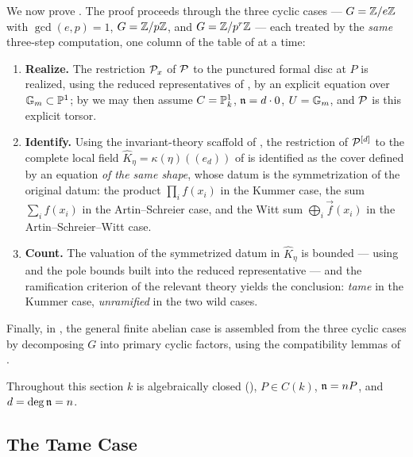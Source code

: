 We now prove . The proof proceeds
through the three cyclic cases --- $G = \mathbb{Z}/e\mathbb{Z}$ with $\gcd(e,p) = 1$,
$G = \mathbb{Z}/p\mathbb{Z}$, and $G = \mathbb{Z}/p^r\mathbb{Z}$ --- each treated by the \emph{same}
three-step computation, one column of the table of
 at a time:
\begin{enumerate}
    \item \textbf{Realize.} The restriction $\mathcal{P}_x$ of $\mathcal{P}$ to the punctured
    formal disc at $P$ is realized, using the reduced representatives of
    , by an explicit equation over
    $\mathbb{G}_m \subset \mathbb{P}^1$; by  we may then assume
    $C = \mathbb{P}^1_k$, $\mathfrak{n} = d \cdot 0$, $U = \mathbb{G}_m$, and $\mathcal{P}$ is this
    explicit torsor.
    \item \textbf{Identify.} Using the invariant-theory scaffold of
    , the restriction of $\mathcal{P}^{[d]}$ to the
    complete local field $\widehat K_\eta = \kappa(\eta)((e_d))$ of
     is identified as the cover
    defined by an equation \emph{of the same shape}, whose datum is the
    symmetrization of the original datum: the product $\prod_i f(x_i)$ in the
    Kummer case, the sum $\sum_i f(x_i)$ in the Artin--Schreier case, and the
    Witt sum $\bigoplus_i \vec f(x_i)$ in the Artin--Schreier--Witt case.
    \item \textbf{Count.} The valuation of the symmetrized datum in
    $\widehat K_\eta$ is bounded --- using
     and the pole bounds built into the
    reduced representative --- and the ramification criterion of the relevant
    theory yields the conclusion: \emph{tame} in the Kummer case,
    \emph{unramified} in the two wild cases.
\end{enumerate}
Finally, in , the general finite
abelian case is assembled from the three cyclic cases by decomposing $G$ into
primary cyclic factors, using the compatibility lemmas of
.

Throughout this section $k$ is algebraically closed
(), $P \in C(k)$, $\mathfrak{n} = nP$, and
$d = \deg \mathfrak{n} = n$.

\subsection{The Tame Case}\label{subsection:tame_case}

